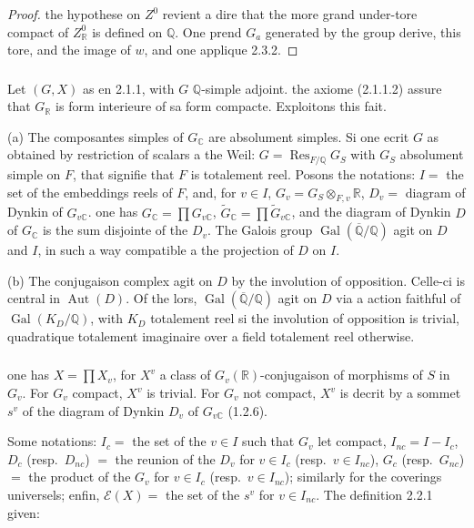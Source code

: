 \documentclass[12pt,a4paper]{article}
\theoremstyle{plain}
\theoremstyle{definition}
\theoremstyle{remark}
\DeclareMathOperator{\Gal}{Gal}
\DeclareMathOperator{\Aut}{Aut}
\DeclareMathOperator{\Res}{Res}
\newcommand{\QQ}{\mathbb{Q}}
\newcommand{\RR}{\mathbb{R}}
\newcommand{\CC}{\mathbb{C}}
\begin{document}
\begin{proof}
the hypothese on $Z^0$ revient a dire that the more grand under-tore compact of $Z^0_{\RR}$ is defined on $\QQ$. One prend $G_a$ generated by the group derive, this tore, and the image of $w$, and one applique 2.3.2.
\end{proof}

\subsubsection{}

Let $(G,X)$ as en 2.1.1, with $G$ $\QQ$-simple adjoint. the axiome (2.1.1.2) assure that $G_{\RR}$ is form interieure of sa form compacte. Exploitons this fait.

(a) The composantes simples of $G_{\CC}$ are absolument simples. Si one ecrit $G$ as obtained by restriction of scalars a the Weil: $G = \Res_{F/\QQ} G_S$ with $G_S$ absolument simple on $F$, that signifie that $F$ is totalement reel. Posons the notations: $I =$ the set of the embeddings reels of $F$, and, for $v \in I$, $G_v = G_S \otimes_{F,v} \RR$, $D_v =$ diagram of Dynkin of $G_{v\CC}$. one has $G_{\CC} = \prod G_{v\CC}$, $\tilde{G}_{\CC} = \prod \tilde{G}_{v\CC}$, and the diagram of Dynkin $D$ of $G_{\CC}$ is the sum disjointe of the $D_v$. The Galois group $\Gal(\overline{\QQ}/\QQ)$ agit on $D$ and $I$, in such a way compatible a the projection of $D$ on $I$.

(b) The conjugaison complex agit on $D$ by the involution of opposition. Celle-ci is central in $\Aut(D)$. Of the lors, $\Gal(\overline{\QQ}/\QQ)$ agit on $D$ via a action faithful of $\Gal(K_D/\QQ)$, with $K_D$ totalement reel si the involution of opposition is trivial, quadratique totalement imaginaire over a field totalement reel otherwise.

\subsubsection{}

one has $X = \prod X_v$, for $X^v$ a class of $G_v(\RR)$-conjugaison of morphisms of $S$ in $G_v$. For $G_v$ compact, $X^v$ is trivial. For $G_v$ not compact, $X^v$ is decrit by a sommet $s^v$ of the diagram of Dynkin $D_v$ of $G_{v\CC}$ (1.2.6).

Some notations: $I_c =$ the set of the $v \in I$ such that $G_v$ let compact, $I_{nc} = I - I_c$, $D_c$ (resp.~$D_{nc}$) $=$ the reunion of the $D_v$ for $v \in I_c$ (resp.~$v \in I_{nc}$), $G_c$ (resp.~$G_{nc}$) $=$ the product of the $G_v$ for $v \in I_c$ (resp.~$v \in I_{nc}$); similarly for the coverings universels; enfin, $\mathcal{E}(X) =$ the set of the $s^v$ for $v \in I_{nc}$. The definition 2.2.1 given:
\end{document}
